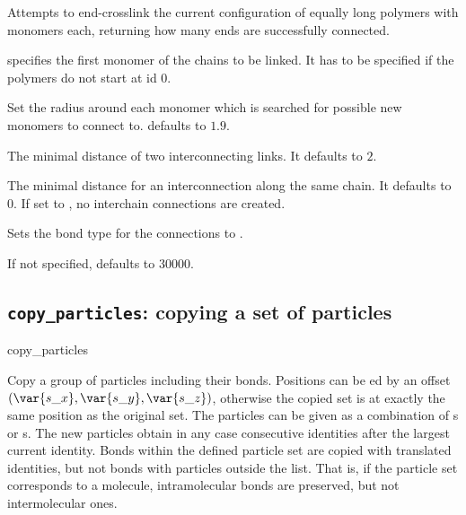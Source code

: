 Attempts to end-crosslink the current configuration of
 equally long polymers with
 monomers each, returning how many ends are
successfully connected.

\begin{arguments}
\item[\opt{start \var{pid}}]  specifies the first monomer of
  the chains to be linked. It has to be specified if the polymers do
  not start at id 0.
\item[\opt{catch \var{r_catch}}] Set the radius around each monomer
  which is searched for possible new monomers to connect to.
   defaults to $1.9$.
\item[\opt{distLink \var{link\_dist}}] The minimal distance of two
  interconnecting links. It defaults to $2$.
\item[\opt{distChain \var{chain\_dist}}] The minimal distance for an
  interconnection along the same chain. It defaults to $0$. If set to
  , no interchain connections are created.
\item[\opt{FENE \var{bondid}}] Sets the bond type for the connections
  to .
\item[\opt{trials \var{try_\mathrm{max}}}] If not specified,
   defaults to $30000$.
\end{arguments}

\subsection{\texttt{copy\_particles}: copying a set of particles}
\begin{essyntax}
  copy_particles
\end{essyntax}

Copy a group of particles including their bonds. Positions can be
ed by an offset $(\var{s\_x}, \var{s\_y}, \var{s\_z})$,
otherwise the copied set is at exactly the same position as the
original set. The particles can be given as a combination of
s or s. The new particles obtain in any case
consecutive identities after the largest current identity. Bonds
within the defined particle set are copied with translated identities,
but not bonds with particles outside the list. That is, if the
particle set corresponds to a molecule, intramolecular bonds are
preserved, but not intermolecular ones.

